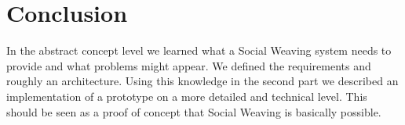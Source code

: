 \section{Conclusion}

In the abstract concept level we learned what a Social Weaving system needs to provide and what problems might appear. We defined the requirements and roughly an architecture. Using this knowledge in the second part we described an implementation of a prototype on a more detailed and technical level. This should be seen as a proof of concept that Social Weaving is basically possible. 